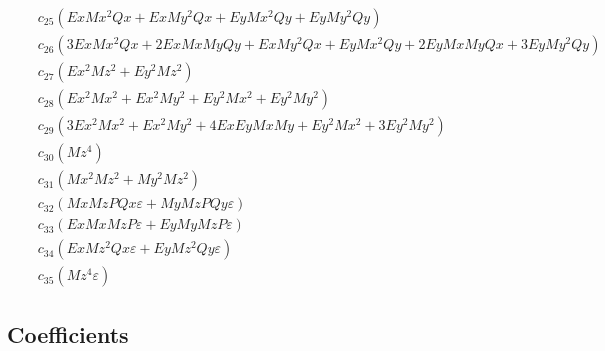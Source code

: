 \documentclass{article}
\begin{document}
\begin{align*}
&\quad c_{25} \left(Ex Mx^{2} Qx + Ex My^{2} Qx + Ey Mx^{2} Qy + Ey My^{2} Qy\right) \\
&\quad c_{26} \left(3 Ex Mx^{2} Qx + 2 Ex Mx My Qy + Ex My^{2} Qx + Ey Mx^{2} Qy + 2 Ey Mx My Qx + 3 Ey My^{2} Qy\right) \\
&\quad c_{27} \left(Ex^{2} Mz^{2} + Ey^{2} Mz^{2}\right) \\
&\quad c_{28} \left(Ex^{2} Mx^{2} + Ex^{2} My^{2} + Ey^{2} Mx^{2} + Ey^{2} My^{2}\right) \\
&\quad c_{29} \left(3 Ex^{2} Mx^{2} + Ex^{2} My^{2} + 4 Ex Ey Mx My + Ey^{2} Mx^{2} + 3 Ey^{2} My^{2}\right) \\
&\quad c_{30} \left(Mz^{4}\right) \\
&\quad c_{31} \left(Mx^{2} Mz^{2} + My^{2} Mz^{2}\right) \\
&\quad c_{32} \left(Mx Mz P Qx ε + My Mz P Qy ε\right) \\
&\quad c_{33} \left(Ex Mx Mz P ε + Ey My Mz P ε\right) \\
&\quad c_{34} \left(Ex Mz^{2} Qx ε + Ey Mz^{2} Qy ε\right) \\
&\quad c_{35} \left(Mz^{4} ε\right)
\end{align*}

\subsection*{Coefficients}
\end{document}
